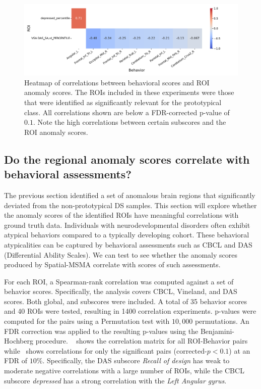 \begin{figure}[htbp!]
\centering
\includegraphics[width=\linewidth]{figures/sig_roi_corrs.pdf}
\caption{Heatmap of correlations between behavioral scores and ROI anomaly scores. The ROIs included in these experiments were those that were identified as significantly relevant for the prototypical class. All correlations shown are below a FDR-corrected p-value of $0.1$. Note the high correlations between certain subscores and the ROI anomaly scores. 
}
\label{fig:sig-roi-corr}
\end{figure}

\subsection*{Do the regional anomaly scores correlate with behavioral assessments?}

The previous section identified a set of anomalous brain regions that significantly deviated from the non-prototypical DS samples. This section will explore whether the anomaly scores of the identified ROIs have meaningful correlations with ground truth data. Individuals with neurodevelopmental disorders often exhibit atypical behaviors compared to a typically developing cohort. These behavioral atypicalities can be captured by behavioral assessments such as CBCL and DAS (Differential Ability Scales). We can test to see whether the anomaly scores produced by Spatial-MSMA correlate with scores of such assessments. 



For each ROI, a Spearman-rank correlation was computed against a set of behavior scores. Specifically, the analysis covers CBCL, Vineland, and DAS scores. Both global, and subscores were included.
A total of 35 behavior scores and 40 ROIs were tested, resulting in 1400 correlation experiments. p-values were computed for the pairs using a Permutation test with $10,000$ permutations. An FDR correction was applied to the resulting p-values using the Benjamini-Hochberg procedure. ~ shows the correlation matrix for all  ROI-Behavior pairs while~ shows correlations for only the significant pairs ($\text{corrected-}p < 0.1$) at an FDR of $10\%$. Specifically, the DAS subscore \textit{Recall of design} has weak to moderate negative correlations with a large number of ROIs, while the CBCL subscore \textit{depressed} has a strong correlation with the \textit{Left Angular gyrus}. 

